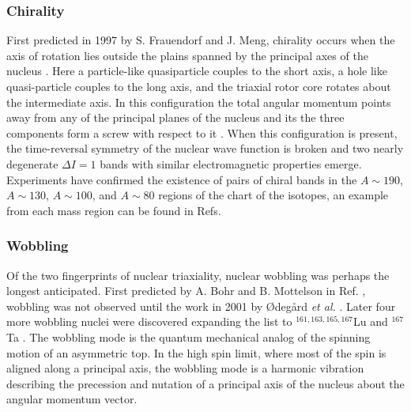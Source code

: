 \subsubsection{Chirality}
\label{sssec:intro-rot-chiral}
First predicted in 1997  by S. Frauendorf and J. Meng, chirality occurs when the axis of rotation lies outside the plains spanned by the principal axes of the nucleus \cite{frauendorfChirality,chiralityOfNuclearRotation,frauendorfTAC}. Here a particle-like quasiparticle couples to the short axis, a hole like quasi-particle couples to the long axis, and the triaxial rotor core rotates about the intermediate axis. In this configuration the total angular momentum points away from any of the principal planes of the nucleus and its the three components form a screw with respect to it \cite{frauendorfChirality}.  When this configuration is present, the time-reversal symmetry of the nuclear wave function is broken and two nearly degenerate $\Delta{}I=1$ bands with similar electromagnetic properties emerge. Experiments have confirmed the existence of pairs of chiral bands in the $A\sim{}190$, $A\sim{}130$, $A\sim{}100$, and  $A\sim{}80$ regions of the chart of the isotopes, an example from each mass region can be found in Refs. \cite{chiralityMore135Nd,chiralityIn104Rh,chiralityIn188Ir,chiralityIn80Br}

\subsubsection{Wobbling}
\label{sssec:intro-rot-wob}
Of the two fingerprints of nuclear triaxiality, nuclear wobbling was perhaps the longest anticipated. First predicted by A. Bohr and B. Mottelson in Ref. \cite{bohrMottelson2}, wobbling was not observed until the work in 2001 by \O{}deg\aa{}rd \emph{et al.} \cite{wobblingIn163Lu}. Later four more wobbling nuclei were discovered expanding the list to $^{161,163,165,167}$Lu and $^{167}$Ta \cite{wobblingIn163Lu,wobblingIn163LuTwoPhonon,wobblingIn165Lu,wobblingIn167Lu,wobblingIn161Lu,wobblingIn167Ta}. The wobbling mode is the quantum mechanical analog of the spinning motion of an asymmetric top. In the high spin limit, where most of the spin is aligned along a principal axis, the wobbling mode is a harmonic vibration describing the precession and nutation of a principal axis of the nucleus about the angular momentum vector.

